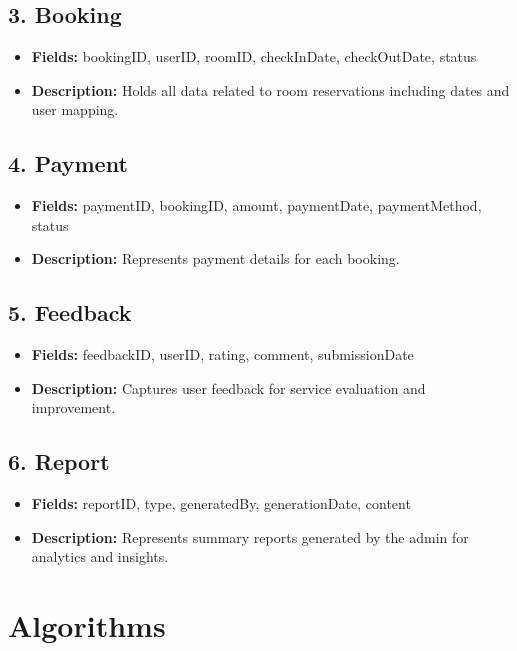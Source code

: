 \documentclass[a4paper,12pt]{article}
\begin{document}
\subsection{3. Booking}
\begin{itemize}
    \item \textbf{Fields:} bookingID, userID, roomID, checkInDate, checkOutDate, status
    \item \textbf{Description:} Holds all data related to room reservations including dates and user mapping.
\end{itemize}

\subsection{4. Payment}
\begin{itemize}
    \item \textbf{Fields:} paymentID, bookingID, amount, paymentDate, paymentMethod, status
    \item \textbf{Description:} Represents payment details for each booking.
\end{itemize}

\subsection{5. Feedback}
\begin{itemize}
    \item \textbf{Fields:} feedbackID, userID, rating, comment, submissionDate
    \item \textbf{Description:} Captures user feedback for service evaluation and improvement.
\end{itemize}

\subsection{6. Report}
\begin{itemize}
    \item \textbf{Fields:} reportID, type, generatedBy, generationDate, content
    \item \textbf{Description:} Represents summary reports generated by the admin for analytics and insights.
\end{itemize}

\section{Algorithms}
\end{document}
